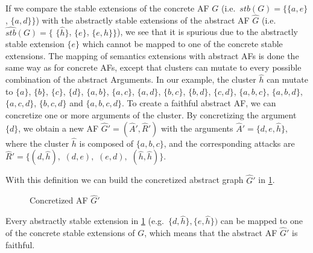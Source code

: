 If we compare the stable extensions of the concrete AF $G$ (i.e.\ 
$stb(G)=\bigl\{\{a, e\}$, $\{a, d\} \bigl\}$) with the abstractly stable extensions of the abstract AF $\hat{G}$ (i.e.\ 
$\hat{stb}(G)=\bigl\{$ 
$\{\hat{h}\}$, 
$\{e\}$, 
$\{e, \hat{h}\}\bigl\}$), 
we see that it is spurious due to the abstractly stable extension $\{e\}$ which cannot be mapped to one of the concrete stable extensions. The mapping of semantics extensions with abstract AFs is done the same way as for concrete AFs, except that clusters can mutate to every possible combination of the abstract Arguments. In our example, the cluster $\hat{h}$ can mutate to
$\{a\}$, 
$\{b\}$, 
$\{c\}$, 
$\{d\}$, 
$\{a, b\}$, 
$\{a, c\}$, 
$\{a, d\}$, 
$\{b, c\}$, 
$\{b, d\}$, 
$\{c, d\}$, 
$\{a, b, c\}$, 
$\{a, b, d\}$, 
$\{a, c, d\}$, 
$\{b, c, d\}$ and
$\{a, b, c, d\}$.
To create a faithful abstract AF, we can concretize one or more arguments of the cluster. By concretizing the argument $\{d\}$, we obtain a new AF $\hat{G}'=(\hat{A}', \hat{R}')$ with the arguments $\hat{A}'=\{d, e, \hat{h}\}$, where the cluster $\hat{h}$ is composed of $\{a, b, c\}$, and the corresponding attacks are $\hat{R}'=\{(d, \hat{h}),$
$(d, e),$
$(e, d),$
$(\hat{h}, \hat{h})\}$.

With this definition we can build the concretized abstract graph $\hat{G}'$ in \cref{af:backgroundClusterExample3}.


\begin{figure}[h]
    \centering
    \caption{Concretized AF $\hat{G}'$}
    \label{af:backgroundClusterExample3}
\end{figure}

Every abstractly stable extension in \cref{af:backgroundClusterExample3} (e.g.\ $\{d, \hat{h}\}, \{e, \hat{h}\})$ can be mapped to one of the concrete stable extensions of $G$, which means that the abstract AF $\hat{G}'$ is faithful.


